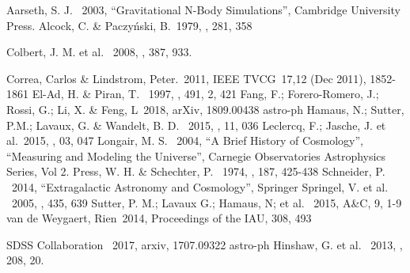 \documentclass[preprint]{aastex62}
\begin{document}
  \nocite{*}

  \begin{thebibliography}{}
     Aarseth, S. J. \ 2003, ``Gravitational N-Body Simulations'', Cambridge University Press.
     Alcock, C. \& Paczy\'nski, B.\ 1979, \nat, 281, 358    

       Colbert, J. M. et al. \ 2008, \mnras, 387, 933.
      
     Correa, Carlos \& Lindstrom, Peter.\ 2011,  IEEE TVCG\ 17,12 (Dec 2011), 1852-1861
     El-Ad, H. \& Piran, T. \ 1997, \apj, 491, 2, 421
     Fang, F.; Forero-Romero, J.; Rossi, G.; Li, X. \& Feng, L\ 2018, arXiv, 1809.00438 astro-ph
     Hamaus, N.; Sutter, P.M.; Lavaux, G. \& Wandelt, B. D. \ 2015, \jcap, 11, 036    
     Leclercq, F.; Jasche, J. et al.\ 2015, \jcap, 03, 047
     Longair, M. S. \ 2004, ``A Brief History of Cosmology'', ``Measuring and Modeling the Universe'', Carnegie Observatories Astrophysics Series, Vol 2.
     Press, W. H. \& Schechter, P. \ 1974, \apj, 187, 425-438
     Schneider, P. \ 2014, ``Extragalactic Astronomy and Cosmology'', Springer
     Springel, V. et al. \ 2005, \nat, 435, 639
     Sutter, P. M.; Lavaux G.; Hamaus, N; et al. \ 2015, A\&C, 9, 1-9
     van de Weygaert, Rien\ 2014, Proceedings of the IAU, 308, 493      

     SDSS Collaboration \ 2017, arxiv, 1707.09322 astro-ph
     Hinshaw, G. et al. \ 2013, \apjs, 208, 20.
  \end{thebibliography}                                                           
                       

\end{document}
